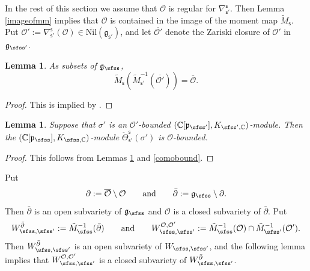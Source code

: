 \documentclass[11pt,a4paper]{amsart}
\newcommand{\CO}{{\mathcal {O}}}
\newcommand{\g}{\mathfrak g}
\newcommand{\p}{\mathfrak p}
\def\DD{\nabla}
\numberwithin{equation}{section}
\newtheorem{lem}[thm]{Lemma}
\theoremstyle{remark}
\def\Nil{\overline{\mathrm{Nil}}}
\begin{document}
In the rest of this section we assume that $\CO$ is regular for $\DD_{\mathsf s'}^{\mathsf s}$. Then Lemma \ref{imageofmm} implies that  $\CO$ is contained in the image of the moment map $\tilde M_{\mathsf s}$. Put  $\CO':=\DD_{\mathsf s'}^{\mathsf s}(\CO)\in  \Nil(\g_{\mathsf s'})$, and let  $\overline{\CO'}$ denote the Zariski closure of $\CO'$ in $\g_{\sfss'}$.


\begin{lem}\label{liftop000}
As subsets of $\g_\sfss$,
\[
  \tilde M_{\mathsf s}(\tilde M_{\mathsf s'}^{-1}(\overline{\CO'}))=\overline{\CO}.
\]
\end{lem}
\begin{proof}
This is implied by \cite[Theorems 5.2 and 5.6]{DKPC}.
\end{proof}


\begin{lem}\label{comobound2}
Suppose that $\sigma'$ is an $\CO'$-bounded $(\C[\p_{\sfss'}], K_{\sfss', \C})$-module.  Then the  $(\C[\p_{\sfss}], K_{\sfss, \C})$-module   $\check \Theta_{\mathsf s'}^{\mathsf s}(\sigma')$ is $\CO$-bounded.
\end{lem}
\begin{proof}
This follows from Lemmas \ref{liftop000} and \ref{comobound}.
\end{proof}


Put
\[
\partial :=\overline \CO\setminus \CO\qquad\textrm{and}\qquad  \bar \partial :=\g_\sfss\setminus \partial.
\]
Then $\bar \partial$ is an open subvariety of $\g_\sfss$ and $\CO$ is a closed subvariety of $\bar \partial$.
Put
\[
W_{\sfss, \sfss'}^{\bar \partial}:=\tilde M_{\sfss}^{-1}(\bar \partial )
\qquad\textrm{and}\qquad
  W_{\sfss, \sfss'}^{\CO, \CO'}:=\tilde M_{\sfss}^{-1}(\CO)\cap  \tilde M_{\sfss'}^{-1}(\CO').
\]
Then $W_{\sfss, \sfss'}^{\bar \partial}$ is an open subvariety of $W_{\sfss, \sfss'}$, and the following lemma implies that $W_{\sfss, \sfss'}^{\CO, \CO'}$ is a closed subvariety of $W_{\sfss, \sfss'}^{\bar \partial}$.
\end{document}
